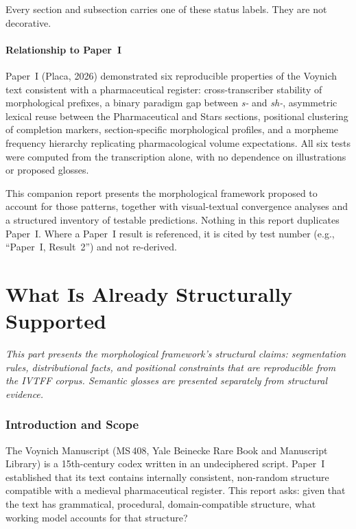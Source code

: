 \documentclass[11pt,a4paper]{article}
\begin{document}
Every section and subsection carries one of these status labels. They are not decorative.

\subsection*{Relationship to Paper~I}

Paper~I (Placa, 2026) demonstrated six reproducible properties of the Voynich text consistent with a pharmaceutical register: cross-transcriber stability of morphological prefixes, a binary paradigm gap between \textit{s-} and \textit{sh-}, asymmetric lexical reuse between the Pharmaceutical and Stars sections, positional clustering of completion markers, section-specific morphological profiles, and a morpheme frequency hierarchy replicating pharmacological volume expectations. All six tests were computed from the transcription alone, with no dependence on illustrations or proposed glosses.

This companion report presents the morphological framework proposed to account for those patterns, together with visual-textual convergence analyses and a structured inventory of testable predictions. Nothing in this report duplicates Paper~I. Where a Paper~I result is referenced, it is cited by test number (e.g., ``Paper~I, Result~2'') and not re-derived.

\part{What Is Already Structurally Supported}

\textit{This part presents the morphological framework's structural claims: segmentation rules, distributional facts, and positional constraints that are reproducible from the IVTFF corpus. Semantic glosses are presented separately from structural evidence.}

\section{Introduction and Scope}

The Voynich Manuscript (MS\,408, Yale Beinecke Rare Book and Manuscript Library) is a 15th-century codex written in an undeciphered script. Paper~I established that its text contains internally consistent, non-random structure compatible with a medieval pharmaceutical register. This report asks: given that the text has grammatical, procedural, domain-compatible structure, what working model accounts for that structure?
\end{document}
